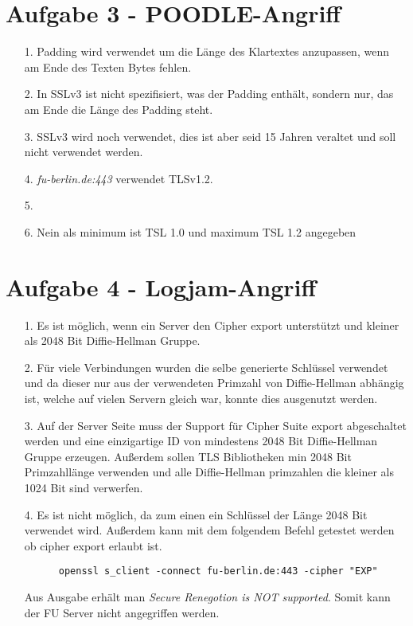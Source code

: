 \documentclass{scrartcl}
\begin{document}
\section*{Aufgabe 3 - POODLE-Angriff}

\begin{itemize}
  \item[1.] Padding wird verwendet um die Länge des Klartextes anzupassen, wenn am Ende des Texten Bytes fehlen.
  \item[2.] In SSLv3 ist nicht spezifisiert, was der Padding enthält, sondern nur, das am Ende die Länge des Padding steht.
  \item[3.] SSLv3 wird noch verwendet, dies ist aber seid 15 Jahren veraltet und soll nicht verwendet werden.
  \item[4.] \textit{fu-berlin.de:443} verwendet TLSv1.2.
  \item[5.]
  \item[6.] Nein als minimum ist TSL 1.0 und maximum TSL 1.2 angegeben
\end{itemize}

\section*{Aufgabe 4 - Logjam-Angriff}

\begin{itemize}
  \item[1.] Es ist möglich, wenn ein Server den Cipher export unterstützt und kleiner als 2048 Bit Diffie-Hellman Gruppe.
  \item[2.] Für viele Verbindungen wurden die selbe generierte Schlüssel
    verwendet und da dieser nur aus der verwendeten Primzahl von Diffie-Hellman
    abhängig ist, welche auf vielen Servern gleich war, konnte dies ausgenutzt werden.
  \item[3.] Auf der Server Seite muss der Support für Cipher Suite export abgeschaltet werden und eine einzigartige ID von mindestens 2048 Bit Diffie-Hellman Gruppe erzeugen. Außerdem sollen TLS Bibliotheken min 2048 Bit Primzahllänge verwenden und alle Diffie-Hellman primzahlen die kleiner als 1024 Bit sind verwerfen.
  \item[4.] Es ist nicht möglich, da zum einen ein Schlüssel der Länge 2048 Bit verwendet wird. Außerdem kann mit dem folgendem Befehl getestet werden ob cipher export erlaubt ist.
    \begin{lstlisting}
      openssl s_client -connect fu-berlin.de:443 -cipher "EXP"
    \end{lstlisting}
    Aus Ausgabe erhält man \textit{Secure Renegotion is NOT supported}. Somit kann der FU Server nicht angegriffen werden.
\end{itemize}
\end{document}
